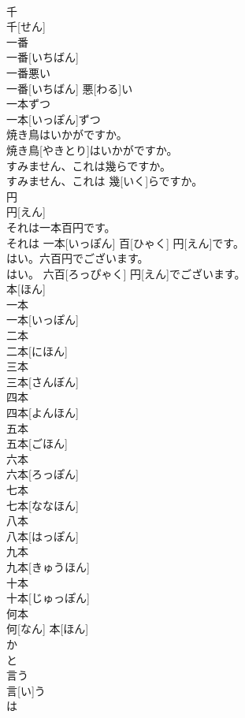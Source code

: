 \documentclass[8pt]{extreport}
\begin{document}
\begin{CJK}{UTF8}{min}
\\	千	
\\	千[せん]
\\	一番	
\\	一番[いちばん]
\\	一番悪い	
\\	一番[いちばん] 悪[わる]い
\\	一本ずつ	
\\	一本[いっぽん]ずつ
\\	焼き鳥はいかがですか。	
\\	焼き鳥[やきとり]はいかがですか。
\\	すみません、これは幾らですか。	
\\	すみません、これは 幾[いく]らですか。
\\	円	
\\	円[えん]
\\	それは一本百円です。	
\\	それは 一本[いっぽん] 百[ひゃく] 円[えん]です。
\\	はい。六百円でございます。	
\\	はい。 六百[ろっぴゃく] 円[えん]でございます。
\\	本[ほん]
\\	一本	
\\	一本[いっぽん]
\\	二本	
\\	二本[にほん]
\\	三本	
\\	三本[さんぼん]
\\	四本	
\\	四本[よんほん]
\\	五本	
\\	五本[ごほん]
\\	六本	
\\	六本[ろっぽん]
\\	七本	
\\	七本[ななほん]
\\	八本	
\\	八本[はっぽん]
\\	九本	
\\	九本[きゅうほん]
\\	十本	
\\	十本[じゅっぽん]
\\	何本	
\\	何[なん] 本[ほん]
\\	か
\\	と
\\	言う	
\\	言[い]う
\\	は

\end{CJK}
\end{document}
